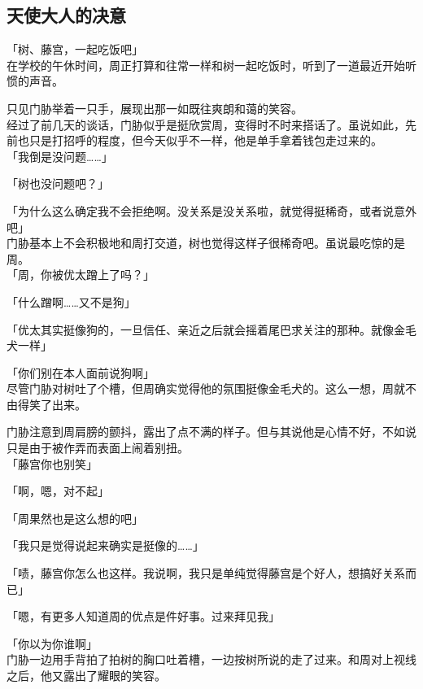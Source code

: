 \subsection{天使大人的决意}

「树、藤宫，一起吃饭吧」\\

在学校的午休时间，周正打算和往常一样和树一起吃饭时，听到了一道最近开始听惯的声音。

只见门胁举着一只手，展现出那一如既往爽朗和蔼的笑容。\\

经过了前几天的谈话，门胁似乎是挺欣赏周，变得时不时来搭话了。虽说如此，先前也只是打招呼的程度，但今天似乎不一样，他是单手拿着钱包走过来的。\\

「我倒是没问题……」

「树也没问题吧？」

「为什么这么确定我不会拒绝啊。没关系是没关系啦，就觉得挺稀奇，或者说意外吧」\\

门胁基本上不会积极地和周打交道，树也觉得这样子很稀奇吧。虽说最吃惊的是周。\\

「周，你被优太蹭上了吗？」

「什么蹭啊……又不是狗」

「优太其实挺像狗的，一旦信任、亲近之后就会摇着尾巴求关注的那种。就像金毛犬一样」

「你们别在本人面前说狗啊」\\

尽管门胁对树吐了个槽，但周确实觉得他的氛围挺像金毛犬的。这么一想，周就不由得笑了出来。

门胁注意到周肩膀的颤抖，露出了点不满的样子。但与其说他是心情不好，不如说只是由于被作弄而表面上闹着别扭。\\

「藤宫你也别笑」

「啊，嗯，对不起」

「周果然也是这么想的吧」

「我只是觉得说起来确实是挺像的……」

「啧，藤宫你怎么也这样。我说啊，我只是单纯觉得藤宫是个好人，想搞好关系而已」

「嗯，有更多人知道周的优点是件好事。过来拜见我」

「你以为你谁啊」\\

门胁一边用手背拍了拍树的胸口吐着槽，一边按树所说的走了过来。和周对上视线之后，他又露出了耀眼的笑容。

